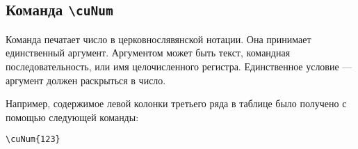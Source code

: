 \begin{RU}
\subsection{Команда \texttt{\textbackslash cuNum}}
Команда печатает число в церковнослявянской нотации.
Она принимает единственный аргумент. Аргументом может быть текст, командная последовательность, или имя 
целочисленного регистра. Единственное условие --- аргумент должен раскрыться в число.

Например, содержимое левой колонки третьего ряда в таблице было получено с помощью
следующей команды:
\begin{verbatim}
\cuNum{123}
\end{verbatim}
\end{RU}



